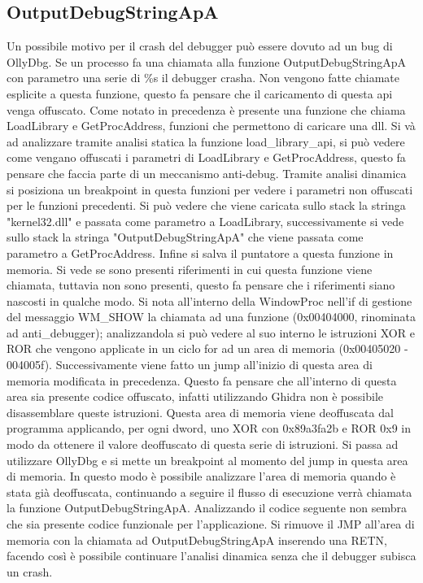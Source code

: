 \documentclass[a4paper,12pt]{article}
\begin{document}
\subsection{OutputDebugStringApA}
Un possibile motivo per il crash del debugger può essere dovuto ad un bug di OllyDbg. Se un processo fa una chiamata alla funzione OutputDebugStringApA con parametro una serie di \%s il debugger crasha. Non vengono fatte chiamate esplicite a questa funzione, questo fa pensare che il caricamento di questa api venga offuscato. Come notato in precedenza è presente una funzione che chiama LoadLibrary e GetProcAddress, funzioni che permettono di caricare una dll. Si và ad analizzare tramite analisi statica la funzione load\_library\_api, si può vedere come vengano offuscati i parametri di LoadLibrary e GetProcAddress, questo fa pensare che faccia parte di un meccanismo anti-debug. Tramite analisi dinamica si posiziona un breakpoint in questa funzioni per vedere i parametri non offuscati per le funzioni precedenti. Si può vedere che viene caricata  sullo stack la stringa "kernel32.dll" e passata come parametro a LoadLibrary, successivamente si vede sullo stack la stringa "OutputDebugStringApA" che viene passata come parametro a GetProcAddress. Infine si salva il puntatore a questa funzione in memoria. Si vede se sono presenti riferimenti in cui questa funzione viene chiamata, tuttavia non sono presenti, questo fa pensare che i riferimenti siano nascosti in qualche modo.  Si nota all'interno della WindowProc nell'if di gestione  del messaggio WM\_SHOW la chiamata ad una funzione (0x00404000, rinominata ad anti\_debugger); analizzandola si può vedere al suo interno le istruzioni XOR e ROR che vengono applicate in un ciclo for ad un area di memoria (0x00405020 - 004005f).
 Successivamente viene fatto un jump all'inizio di questa area di memoria modificata in precedenza. Questo fa pensare che all'interno di questa area sia presente codice offuscato, infatti utilizzando Ghidra non è possibile disassemblare queste istruzioni.  Questa area di memoria viene deoffuscata dal programma applicando, per ogni dword, uno XOR con 0x89a3fa2b e ROR 0x9 in modo da ottenere il valore deoffuscato di questa serie di istruzioni.
 Si passa ad utilizzare OllyDbg e si mette un breakpoint al momento del jump in questa area di memoria. In questo modo è possibile analizzare l'area di memoria quando è stata già deoffuscata, continuando a seguire il flusso di esecuzione verrà chiamata la funzione OutputDebugStringApA. Analizzando il codice seguente non sembra che sia presente codice funzionale per l'applicazione. Si rimuove il JMP all'area di memoria con la chiamata ad OutputDebugStringApA inserendo una RETN, facendo così è possibile continuare l'analisi dinamica senza che il debugger subisca un crash.
\end{document}
